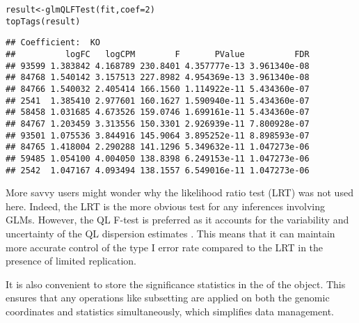 \documentclass{report}\usepackage[]{graphicx}\usepackage[usenames,dvipsnames]{color}
\newcommand{\hlnum}[1]{\textcolor[rgb]{0.816,0.125,0.439}{#1}}%
\newcommand{\hlopt}[1]{\textcolor[rgb]{0,0,0}{#1}}%
\newcommand{\hlstd}[1]{\textcolor[rgb]{0.251,0.251,0.251}{#1}}%
\newcommand{\hlkwb}[1]{\textcolor[rgb]{0,0,0}{#1}}%
\newcommand{\hlkwc}[1]{\textcolor[rgb]{0.251,0.251,0.251}{#1}}%
\newcommand{\hlkwd}[1]{\textcolor[rgb]{0.878,0.439,0.125}{#1}}%
\newenvironment{knitrout}{}{} %
\begin{document}
\begin{knitrout}
\color{fgcolor}\begin{kframe}
\begin{alltt}
\hlstd{result} \hlkwb{<-} \hlkwd{glmQLFTest}\hlstd{(fit,} \hlkwc{coef}\hlstd{=}\hlnum{2}\hlstd{)}
\hlkwd{topTags}\hlstd{(result)}
\end{alltt}
\begin{verbatim}
## Coefficient:  KO 
##          logFC   logCPM        F       PValue          FDR
## 93599 1.383842 4.168789 230.8401 4.357777e-13 3.961340e-08
## 84768 1.540142 3.157513 227.8982 4.954369e-13 3.961340e-08
## 84766 1.540032 2.405414 166.1560 1.114922e-11 5.434360e-07
## 2541  1.385410 2.977601 160.1627 1.590940e-11 5.434360e-07
## 58458 1.031685 4.673526 159.0746 1.699161e-11 5.434360e-07
## 84767 1.203459 3.313556 150.3301 2.926939e-11 7.800928e-07
## 93501 1.075536 3.844916 145.9064 3.895252e-11 8.898593e-07
## 84765 1.418004 2.290288 141.1296 5.349632e-11 1.047273e-06
## 59485 1.054100 4.004050 138.8398 6.249153e-11 1.047273e-06
## 2542  1.047167 4.093494 138.1557 6.549016e-11 1.047273e-06
\end{verbatim}
\end{kframe}
\end{knitrout}

More savvy users might wonder why the likelihood ratio test (LRT) was not used here.
Indeed, the LRT is the more obvious test for any inferences involving GLMs. 
However, the QL F-test is preferred as it accounts for the variability and uncertainty of the QL dispersion estimates \cite{lund2012ql}. 
This means that it can maintain more accurate control of the type I error rate compared to the LRT in the presence of limited replication.

It is also convenient to store the significance statistics in the  of the  object.
This ensures that any operations like subsetting are applied on both the genomic coordinates and statistics simultaneously, which simplifies data management.

\begin{knitrout}
\color{fgcolor}
\end{knitrout}
\end{document}
